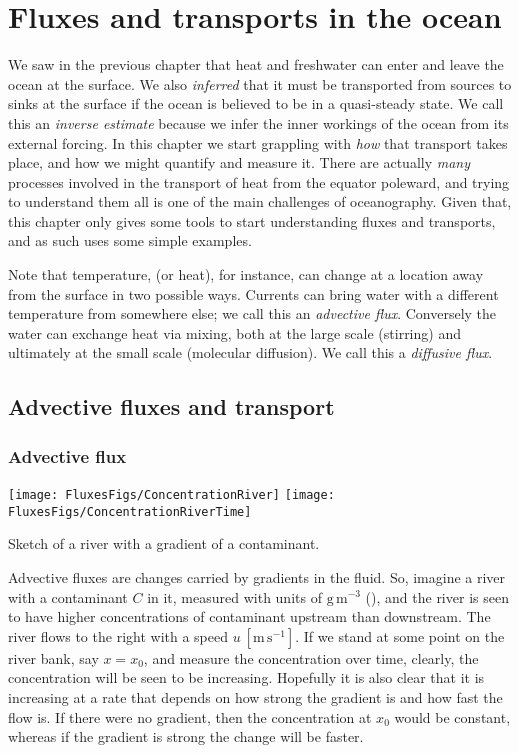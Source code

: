 \chapter{Fluxes and transports in the ocean}
\label{ch:fluxestransports}

We saw in the previous chapter that heat and freshwater can enter and leave the ocean at the surface.  We also \emph{inferred} that it must be transported from sources to sinks at the surface if the ocean is believed to be in a quasi-steady state.  We call this an \emph{inverse estimate} because we infer the inner workings of the ocean from its external forcing.  In this chapter we start grappling with \emph{how} that transport takes place, and how we might quantify and measure it.  There are actually \emph{many} processes involved in the transport of heat from the equator poleward, and trying to understand them all is one of  the main challenges of oceanography.  Given that, this chapter only gives some tools to start understanding fluxes and transports, and as such uses some simple examples.  

Note that temperature, (or heat), for instance, can change at a location away from the surface in two possible ways.  Currents can bring water with a different temperature from somewhere else; we call this an \emph{advective flux}.    Conversely the water can exchange heat via mixing, both at the large scale (stirring) and ultimately at the small scale (molecular diffusion).  We call this a \emph{diffusive flux}.  

\section{Advective fluxes and transport}
\subsection{Advective flux} 

\begin{marginfigure}
\begin{center}
\texttt{[image: FluxesFigs/ConcentrationRiver]}
\texttt{[image: FluxesFigs/ConcentrationRiverTime]}
 \caption{Sketch of a river with a gradient of a contaminant.}
  \label{fig:ConcentrationRiver}
\end{center}
\end{marginfigure}


Advective fluxes are changes carried by gradients in the fluid.  So, imagine a river with a contaminant $C$ in it, measured with units of $\mathrm{g\,m^{-3}}$ (), and the river is seen to have higher concentrations of contaminant upstream than downstream.    The river flows to the right with a speed $u\ \mathrm{[m\,s^{-1}]}$.   If we stand at some point on the river bank, say $x = x_0$, and measure the concentration over time, clearly, the concentration will be seen to be increasing.  Hopefully it is also clear that it is increasing at a rate that depends on how strong the gradient is and how fast the flow is.  If there were no gradient, then the concentration at $x_0$ would be constant, whereas if the gradient is strong the change will be faster.  

